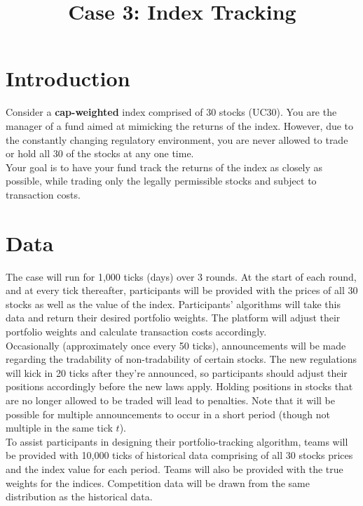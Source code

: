 \documentclass{amsart}
\renewcommand{\_}[1]{\underline{ #1 }}
\theoremstyle{definition}
\numberwithin{equation}{subsection}
\begin{document}
\title{Case 3: Index Tracking}
\maketitle

\setlength{\parindent}{0.5cm}
\section{Introduction}

Consider a \textbf{cap-weighted} index comprised of 30 stocks (UC30). You are the manager of a fund aimed at mimicking the returns of the index. However, due to the constantly changing regulatory environment, you are never allowed to trade or hold all 30 of the stocks at any one time.\\

Your goal is to have your fund track the returns of the index as closely as possible, while trading only the legally permissible stocks and subject to transaction costs.

\section{Data}
The case will run for 1,000 ticks (days) over 3 rounds. At the start of each round, and at every tick thereafter, participants will be provided with the prices of all 30 stocks as well as the value of the index. Participants' algorithms will take this data and return their desired portfolio weights. The platform will adjust their portfolio weights and calculate transaction costs accordingly. \\

Occasionally (approximately once every 50 ticks), announcements will be made regarding the tradability of non-tradability of certain stocks. The new regulations will kick in 20 ticks after they're announced, so participants should adjust their positions accordingly before the new laws apply. Holding positions in stocks that are no longer allowed to be traded will lead to penalties. Note that it will be possible for multiple announcements to occur in a short period (though not multiple in the same tick $t$).\\

To assist participants in designing their portfolio-tracking algorithm, teams will be provided with 10,000 ticks of historical data comprising of all 30 stocks prices and the index value for each period. Teams will also be provided with the true weights for the indices. Competition data will be drawn from the same distribution as the historical data. \\
\end{document}
